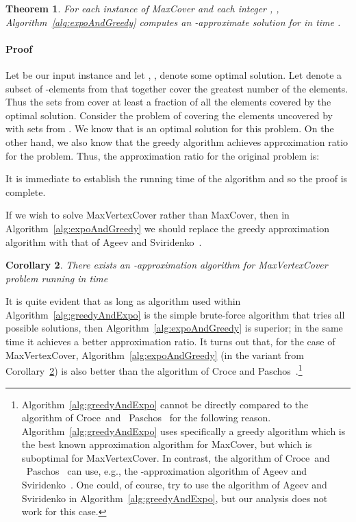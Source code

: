 \documentclass[11pt]{article}
\newtheorem{theorem}{Theorem}
\newtheorem{corollary}[theorem]{Corollary}
\newenvironment{proof}{\paragraph{Proof}}{\hfill\medskip}
\begin{document}
\begin{theorem}
  For each instance  of MaxCover and each integer
  , , Algorithm~\ref{alg:expoAndGreedy} computes
  an -approximate solution for
   in time .
\end{theorem}
\begin{proof}
  Let  be our input instance and let ,
  , denote some optimal solution. Let
   denote a subset of -elements from 
  that together cover the greatest number of the elements. Thus the
  sets from  cover at least a fraction  of all
  the elements covered by the optimal solution. Consider the problem
  of covering the elements uncovered by  with  sets
  from . We know that  is an optimal solution for this problem. On the other
  hand, we also know that the greedy algorithm achieves approximation
  ratio  for the problem. Thus, the approximation
  ratio for the original problem is:
  
  It is immediate to establish the running time of the algorithm and
  so the proof is complete.~
\end{proof}

If we wish to solve MaxVertexCover rather than MaxCover, then in
Algorithm~\ref{alg:expoAndGreedy} we should replace the greedy
approximation algorithm with that of Ageev and
Sviridenko~\cite{age-svi:b:covers}.

\begin{corollary}\label{alg5:maxvertexcover}
There exists an -approximation algorithm for MaxVertexCover problem running in time 
\end{corollary}

It is quite evident that as long as algorithm  used within
Algorithm~\ref{alg:greedyAndExpo} is the simple brute-force algorithm
that tries all possible solutions, then
Algorithm~\ref{alg:expoAndGreedy} is superior; in the same time it
achieves a better approximation ratio. It turns out that, for the case
of MaxVertexCover, Algorithm~\ref{alg:expoAndGreedy} (in the variant
from Corollary~\ref{alg5:maxvertexcover}) is also better than the
algorithm of Croce and
Paschos~\cite{cro-pas:j:cover}.\footnote{Algorithm~\ref{alg:greedyAndExpo}
  cannot be directly compared to the algorithm of Croce~and
  ~Paschos~\cite{cro-pas:j:cover} for the following reason.
  Algorithm~\ref{alg:greedyAndExpo} uses specifically a greedy
  algorithm which is the best known approximation algorithm for
  MaxCover, but which is suboptimal for MaxVertexCover. In contrast,
  the algorithm of Croce~and ~Paschos~\cite{cro-pas:j:cover} can use,
  e.g., the -approximation algorithm of Ageev and
  Sviridenko~\cite{age-svi:b:covers}. One could, of course, try to use
  the algorithm of Ageev and Sviridenko in
  Algorithm~\ref{alg:greedyAndExpo}, but our analysis does not work
  for this case.}
\end{document}
